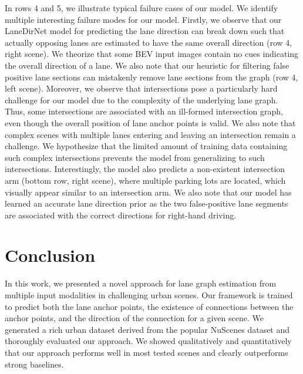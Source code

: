 \documentclass[letterpaper, 10 pt, conference]{ieeeconf}
\begin{document}
In rows 4 and 5, we illustrate typical failure cases of our model. We identify multiple interesting failure modes for our model. Firstly, we observe that our LaneDirNet model for predicting the lane direction can break down such that actually opposing lanes are estimated to have the same overall direction (row 4, right scene). We theorize that some BEV input images contain no cues indicating the overall direction of a lane. We also note that our heuristic for filtering false positive lane sections can mistakenly remove lane sections from the graph (row 4, left scene). Moreover, we observe that intersections pose a particularly hard challenge for our model due to the complexity of the underlying lane graph. Thus, some intersections are associated with an ill-formed intersection graph, even though the overall position of lane anchor points is valid. We also note that complex scenes with multiple lanes entering and leaving an intersection remain a challenge. We hypothesize that the limited amount of training data containing such complex intersections prevents the model from generalizing to such intersections. Interestingly, the model also predicts a non-existent intersection arm (bottom row, right scene), where multiple parking lots are located, which visually appear similar to an intersection arm. We also note that our model has learned an accurate lane direction prior as the two false-positive lane segments are associated with the correct directions for right-hand driving. 
\section{Conclusion}
\label{sec:conclusion}
In this work, we presented a novel approach for lane graph estimation from multiple input modalities in challenging urban scenes. Our framework is trained to predict both the lane anchor points, the existence of connections between the anchor points, and the direction of the connection for a given scene. We generated a rich urban dataset derived from the popular NuScenes dataset and thoroughly evaluated our approach. We showed qualitatively and quantitatively that our approach performs well in most tested scenes and clearly outperforms strong baselines. 












{\small


}
\end{document}
